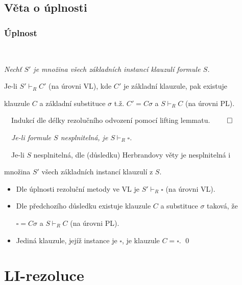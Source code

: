 \subsection{Věta o úplnosti}\todo

\subsubsection*{Úplnost}
    {\bf {}}\ \ {\it Nechť $S'$ je množina všech základních instancí klauzulí formule $S$.
    \smallskip
    
    Je-li $S'\vdash_R C'$ (na úrovni VL), kde $C'$ je základní klauzule, pak existuje
    \smallskip
    
    klauzule $C$ a základní substituce $\sigma$ t.ž. $C'=C\sigma$ a $S\vdash_R C$ (na úrovni PL).}
    \medskip
    
    {\it {}}\ \ Indukcí dle délky rezolučního odvození pomocí lifting lemmatu. $\qed$
    \bigskip
    
    {\bf {}}\ \ {\it Je-li formule $S$ nesplnitelná, je $S\vdash_R \square$.}
    \medskip
    
    {\it {}}\ \ Je-li $S$ nesplnitelná, dle (důsledku) Herbrandovy věty je nesplnitelná i
    \smallskip
    
    množina $S'$ všech základních instancí klauzulí z $S$.
    \vspace{0.5mm}
    
    \begin{itemize}
    \item Dle úplnosti rezoluční metody ve VL je $S' \vdash_R \square$ (na úrovni VL).
    \smallskip
    
    \item Dle předchozího důsledku existuje klauzule $C$ a substituce $\sigma$ taková, že
    \smallskip
    
    $\square = C\sigma$ a $S\vdash_R C$ (na úrovni PL).
    \smallskip
    
    \item Jediná klauzule, jejíž instance je $\square$, je klauzule $C=\square$. \qed
    \end{itemize}
    
    
   


\section{LI-rezoluce}\todo

